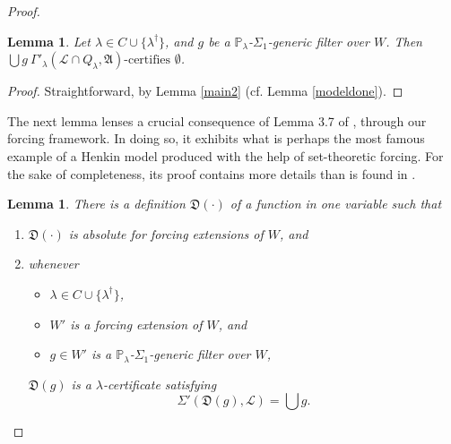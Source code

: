 \documentclass[12pt, twoside]{memoir}
\numberwithin{equation}{section}
\newtheorem{lem}[thm]{Lemma}
\theoremstyle{definition}
\theoremstyle{remark}
\theoremstyle{definition}
\theoremstyle{definition}
\theoremstyle{definition}
\theoremstyle{remark}
\begin{document}
\begin{proof}
\begin{lem}\label{modeldone2}
Let $\lambda \in C \cup \{\lambda^{\dagger}\}$, and $g$ be a $\mathbb{P}_{\lambda}$-$\Sigma_1$-generic filter over $W$. Then $\bigcup g \ \Gamma'_{\lambda} (\mathcal{L} \cap Q_{\lambda}, \mathfrak{A}) \text{-certifies } \emptyset$.
\end{lem}

\begin{proof}
Straightforward, by Lemma \ref{main2} (cf. Lemma \ref{modeldone}).
\end{proof}

The next lemma lenses a crucial consequence of Lemma 3.7 of \cite{schindler}, through our forcing framework. In doing so, it exhibits what is perhaps the most famous example of a Henkin model produced with the help of set-theoretic forcing. For the sake of completeness, its proof contains more details than is found in \cite{schindler}.

\begin{lem}\label{lem446}
There is a definition $\mathfrak{D}(\cdot)$ of a function in one variable such that
\begin{enumerate}[label=(\arabic*)]
    \item\label{4461} $\mathfrak{D}(\cdot)$ is absolute for forcing extensions of $W$, and
    \item\label{4462} whenever
    \begin{itemize}
        \item $\lambda \in C \cup \{\lambda^{\dagger}\}$, 
        \item $W'$ is a forcing extension of $W$, and
        \item $g \in W'$ is a $\mathbb{P}_{\lambda}$-$\Sigma_1$-generic filter over $W$,
    \end{itemize}
    $\mathfrak{D}(g)$ is a $\lambda$-certificate satisfying 
    \begin{equation*}
        \Sigma'(\mathfrak{D}(g), \mathcal{L}) = \bigcup g \text{.}
    \end{equation*} 
\end{enumerate} 
\end{lem}


\end{proof}
\end{document}
